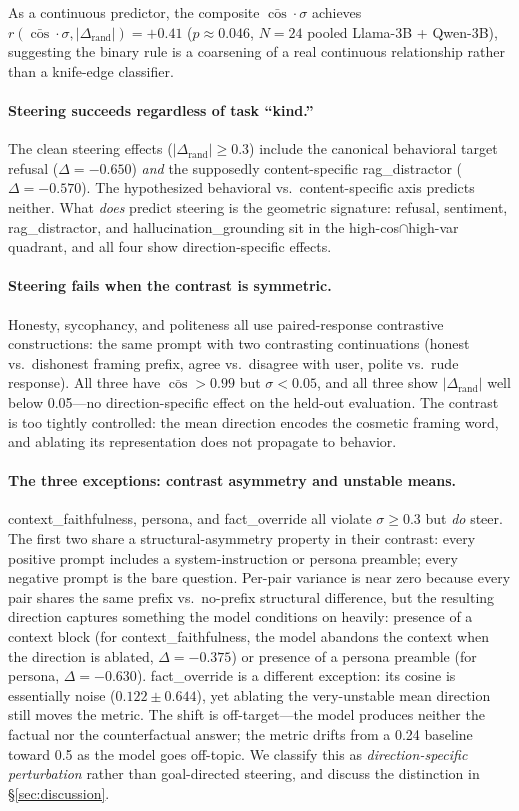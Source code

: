 \documentclass[11pt]{article}
\begin{document}
As a continuous predictor, the composite
$\bar{\cos} \cdot \sigma$ achieves
$r(\bar{\cos} \cdot \sigma, |\Delta_{\text{rand}}|) = +0.41$
($p \approx 0.046$, $N{=}24$ pooled Llama-3B + Qwen-3B), suggesting
the binary rule is a coarsening of a real continuous relationship
rather than a knife-edge classifier.

\paragraph{Steering succeeds regardless of task ``kind.''}
The clean steering effects
($|\Delta_{\text{rand}}| \geq 0.3$) include the canonical behavioral
target refusal ($\Delta = -0.650$) \emph{and} the supposedly
content-specific rag\_distractor ($\Delta = -0.570$). The
hypothesized behavioral vs.~content-specific axis predicts neither.
What \emph{does} predict steering is the geometric signature:
refusal, sentiment, rag\_distractor, and hallucination\_grounding
sit in the high-cos$\cap$high-var quadrant, and all four show
direction-specific effects.

\paragraph{Steering fails when the contrast is symmetric.}
Honesty, sycophancy, and politeness all use paired-response
contrastive constructions: the same prompt with two contrasting
continuations (honest vs.~dishonest framing prefix, agree
vs.~disagree with user, polite vs.~rude response). All three have
$\bar{\cos} > 0.99$ but $\sigma < 0.05$, and all three show
$|\Delta_{\text{rand}}|$ well below 0.05---no direction-specific
effect on the held-out evaluation. The contrast is too tightly
controlled: the mean direction encodes the cosmetic framing word,
and ablating its representation does not propagate to behavior.

\paragraph{The three exceptions: contrast asymmetry and unstable
means.}
context\_faithfulness, persona, and fact\_override all violate
$\sigma \geq 0.3$ but \emph{do} steer. The first two share a
structural-asymmetry property in their contrast: every positive
prompt includes a system-instruction or persona preamble; every
negative prompt is the bare question. Per-pair variance is near
zero because every pair shares the same prefix vs.~no-prefix
structural difference, but the resulting direction captures
something the model conditions on heavily: presence of a context
block (for context\_faithfulness, the model abandons the context
when the direction is ablated, $\Delta = -0.375$) or presence of a
persona preamble (for persona, $\Delta = -0.630$).
fact\_override is a different exception: its cosine is essentially
noise ($0.122 \pm 0.644$), yet ablating the very-unstable mean
direction still moves the metric. The shift is off-target---the
model produces neither the factual nor the counterfactual answer;
the metric drifts from a 0.24 baseline toward 0.5 as the model goes
off-topic. We classify this as \emph{direction-specific perturbation}
rather than goal-directed steering, and discuss the distinction in
\S\ref{sec:discussion}.
\end{document}
